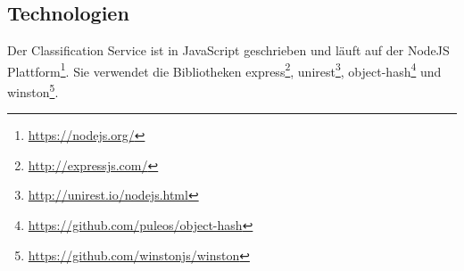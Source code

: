 \subsection{Technologien}
    Der Classification Service ist in JavaScript geschrieben und läuft auf der
    NodeJS Plattform\footnote{\url{https://nodejs.org/}}.
    Sie verwendet die Bibliotheken
    express\footnote{\url{http://expressjs.com/}},
    unirest\footnote{\url{http://unirest.io/nodejs.html}},
    object-hash\footnote{\url{https://github.com/puleos/object-hash}}
    und winston\footnote{\url{https://github.com/winstonjs/winston}}.